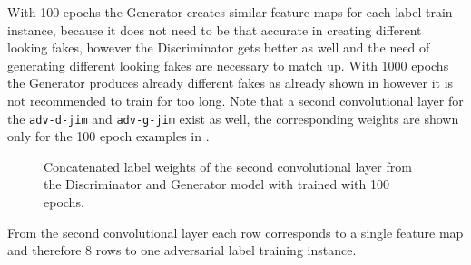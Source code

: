 With 100 epochs the Generator creates similar feature maps for each label train instance, because it does not need to be that accurate in creating different looking fakes, however the Discriminator gets better as well and the need of generating different looking fakes are necessary to match up.
With 1000 epochs the Generator produces already different fakes as already shown in  however it is not recommended to train for too long.
Note that a second convolutional layer for the \texttt{adv-d-jim} and \texttt{adv-g-jim} exist as well, the corresponding weights are shown only for the 100 epoch examples in .
\begin{figure}[!ht]
  \centering
  \qquad \qquad
  \caption{Concatenated label weights of the second convolutional layer from the Discriminator and Generator model with trained with 100 epochs.}
  \label{fig:nn_adv_label_weights_conv1}
\end{figure}
\FloatBarrier
\noindent
From the second convolutional layer each row corresponds to a single feature map and therefore 8 rows to one adversarial label training instance.